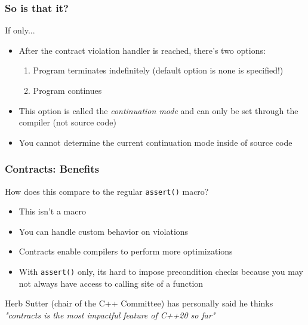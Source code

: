 \documentclass{beamer}
\begin{document}
\begin{frame}
\frametitle{So is that it?}

If only...

\vspace{2em}

\begin{itemize}
\setlength\itemsep{2em}
\item After the contract violation handler is reached, there's two options:
\begin{enumerate}
\item Program terminates indefinitely (default option is none is specified!)
\item Program continues
\end{enumerate}

\item This option is called the \emph{continuation mode} and can only be set through the compiler (not source code)

\item You cannot determine the current continuation mode inside of source code
\end{itemize}
\end{frame}

\begin{frame}
\frametitle{Contracts: Benefits}

How does this compare to the regular \texttt{assert()} macro?
\begin{itemize}
\setlength\itemsep{2em}
\item This isn't a macro

\item You can handle custom behavior on violations

\item Contracts enable compilers to perform more optimizations

\item With \texttt{assert()} only, its hard to impose precondition checks because you may not always have access to calling site of a function
\end{itemize}
\vspace{1em}

Herb Sutter (chair of the C++ Committee) has personally said he thinks \textit{"contracts is the most impactful feature of C++20 so far"}


\end{frame}

\end{document}
